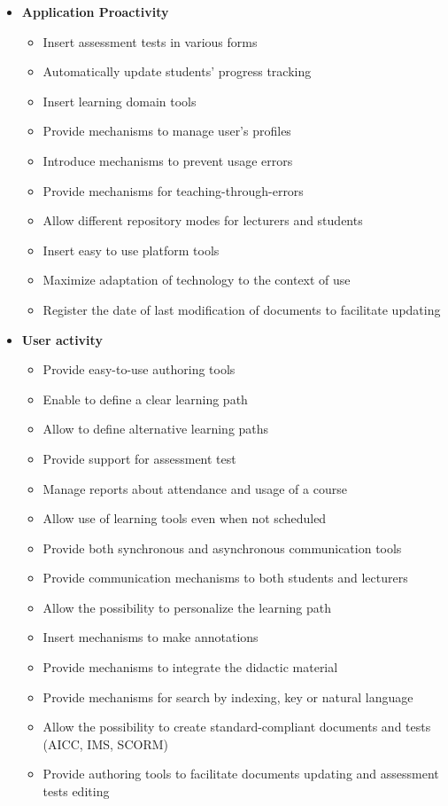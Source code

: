 \begin{itemize}
	\item \textbf{Application Proactivity}
		\begin{itemize}
			\item Insert assessment tests in various forms
			\item Automatically update students' progress tracking
			\item Insert learning domain tools
			\item Provide mechanisms to manage user's profiles
			\item Introduce mechanisms to prevent usage errors
			\item Provide mechanisms for teaching-through-errors
			\item Allow different repository modes for lecturers and students
			\item Insert easy to use platform tools
			\item Maximize adaptation of technology to the context of use
			\item Register the date of last modification of documents to facilitate updating
		\end{itemize}
		
	\item \textbf{User activity}
		\begin{itemize}
			\item Provide easy-to-use authoring tools
			\item Enable to define a clear learning path
			\item Allow to define alternative learning paths
			\item Provide support for assessment test
			\item Manage reports about attendance and usage of a course
			\item Allow use of learning tools even when not scheduled
			\item Provide both synchronous and asynchronous communication tools
			\item Provide communication mechanisms to both students and lecturers
			\item Allow the possibility to personalize the learning path
			\item Insert mechanisms to make annotations
			\item Provide mechanisms to integrate the didactic material
			\item Provide mechanisms for search by indexing, key or natural language
			\item Allow the possibility to create standard-compliant documents and tests (AICC, IMS, SCORM)
			\item Provide authoring tools to facilitate documents updating and assessment tests editing
		\end{itemize}
\end{itemize}